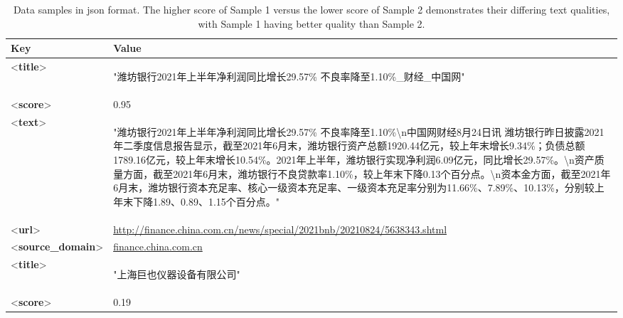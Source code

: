 \documentclass{article}
\begin{document}
 
 \begin{table}[htbp]
    \caption{Data samples in json format. The higher score of Sample 1 versus the lower score of Sample 2 demonstrates their differing text qualities, with Sample 1 having better quality than Sample 2. }
    \label{Data Example Format}
    \centering
    \begin{tabular}{p{2.5cm} p{12cm} }
    \toprule
      \textbf{Key} & \textbf{Value}\\
     \midrule
        <\textbf{title}> &\begin{CJK}{UTF8}{gbsn}"潍坊银行2021年上半年净利润同比增长29.57\% 不良率降至1.10\%\_财经\_中国网"\end{CJK}\\
        <\textbf{score}>& 0.95 \\
        <\textbf{text}> & \multicolumn{1}{m{12cm}}{\begin{CJK}{UTF8}{gbsn} "潍坊银行2021年上半年净利润同比增长29.57\% 不良率降至1.10\%\textbackslash n中国网财经8月24日讯 潍坊银行昨日披露2021年二季度信息报告显示，截至2021年6月末，潍坊银行资产总额1920.44亿元，较上年末增长9.34\%；负债总额1789.16亿元，较上年末增长10.54\%。2021年上半年，潍坊银行实现净利润6.09亿元，同比增长29.57\%。\textbackslash n资产质量方面，截至2021年6月末，潍坊银行不良贷款率1.10\%，较上年末下降0.13个百分点。\textbackslash n资本金方面，截至2021年6月末，潍坊银行资本充足率、核心一级资本充足率、一级资本充足率分别为11.66\%、7.89\%、10.13\%，分别较上年末下降1.89、0.89、1.15个百分点。" \end{CJK}}  \\
        <\textbf{url}> & \url{http://finance.china.com.cn/news/special/2021bnb/20210824/5638343.shtml}\\
        <\textbf{source\_domain}> & \url{finance.china.com.cn}\\
         \midrule
        <\textbf{title}> &\begin{CJK}{UTF8}{gbsn}"上海巨也仪器设备有限公司"\end{CJK}\\
        <\textbf{score}>& 0.19 \\

\end{tabular}
\end{table}
\end{document}
